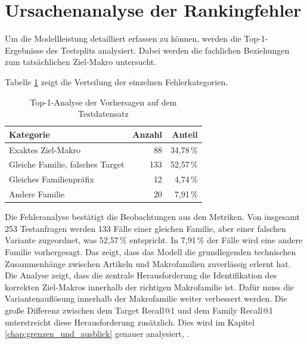 \section{Ursachenanalyse der Rankingfehler}

Um die Modellleistung detailliert erfassen zu können, werden die Top-1-Ergebnisse des Testsplits analysiert. Dabei werden die fachlichen Beziehungen zum tatsächlichen Ziel-Makro untersucht.

Tabelle \ref{tab:fehleranalyse_top1} zeigt die Verteilung der einzelnen Fehlerkategorien. 

\begin{table}[H] 
  \centering 
  \caption{Top-1-Analyse der Vorhersagen auf dem Testdatensatz} 
  \label{tab:fehleranalyse_top1} 
  \begin{tabular}{lrr} 
    \toprule 
    \textbf{Kategorie} & \textbf{Anzahl} & \textbf{Anteil} \\ 
    \midrule 
    Exaktes Ziel-Makro \parencite{EPLAN-Makros} & 88 & 34,78\,\% \\
    Gleiche Familie, falsches Target & 133 & 52,57\,\% \\
    Gleiches Familienpräfix & 12 & 4,74\,\% \\
    Andere Familie & 20 & 7,91\,\% \\
    \bottomrule 
  \end{tabular} 
\end{table}

Die Fehleranalyse bestätigt die Beobachtungen aus den Metriken. Von insgesamt 253 Testanfragen werden 133 Fälle einer gleichen Familie, aber einer falschen Variante zugeordnet, was 52,57\,\% entspricht.
In 7,91\,\% der Fälle wird eine andere Familie vorhergesagt. Das zeigt, dass das Modell die grundlegenden technischen Zusammenhänge zwischen Artikeln und Makrofamilien zuverlässig erlernt hat.
Die Analyse zeigt, dass die zentrale Herausforderung die Identifikation des korrekten Ziel-Makros \parencite{EPLAN-Makros} innerhalb der richtigen Makrofamilie ist. Dafür muss die Variantenauflösung innerhalb der Makrofamilie weiter verbessert werden.
Die große Differenz zwischen dem Target Recall@1 und dem Family Recall@1 unterstreicht diese Herausforderung zusätzlich.
Dies wird im Kapitel \ref{chap:grenzen_und_ausblick} genauer analysiert, \parencite{LTR_Configuration_Test_Series}.


